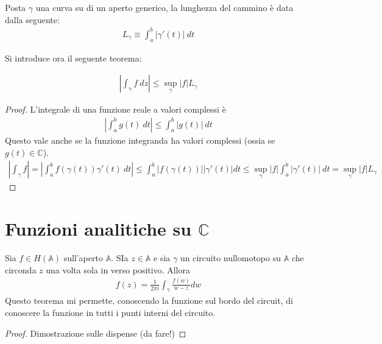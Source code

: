 \documentclass[a4paper, oneside]{article}
\begin{document}
\begin{definition}
    Posta $\gamma$ una curva su di un aperto generico, la lunghezza del cammino 
    è data dalla seguente:
    \begin{align}
        L_\gamma \equiv \int_{a}^{b} \left| \gamma'(t) \right| \ dt  
    \end{align}
\end{definition}
Si introduce ora il seguente teorema:
\begin{theorem}
    \begin{align}
        \left| \int_{\gamma} f \ dz  \right| \leq \sup_{\gamma} \left| f \right| L_\gamma   
    \end{align}
\end{theorem}
\begin{proof}
    L'integrale di una funzione reale a valori complessi è 
    \begin{gather*}
        \left| \int_{a}^{b} g(t) \ dt  \right| \leq \int_{a}^{b} \left| g(t) \right| \ dt    
    \end{gather*}
    Questo vale anche se la funzione integranda ha valori complessi (ossia se $g(t) \in \mathbb{C}$).
    \begin{gather*}
        \left| \int_{\gamma}^{} f \right| = \left| \int_{a}^{b} f(\gamma(t)) \gamma'(t)   \ dt \right| \leq  \int_{a}^{b} \left| f(\gamma(t)) \right| \left| \gamma'(t) \right|  dt \leq \sup_{\gamma}\left| f \right| \int_{a}^{b} \left| \gamma'(t) \right| \ dt = \sup_{\gamma}\left| f \right| L_\gamma    
    \end{gather*}
\end{proof}


\section{Funzioni analitiche su $\mathbb{C}$}
\begin{theorem}
    Sia $f \in H(\mathbb{A})$ sull'aperto $\mathbb{A}$. SIa $z \in \mathbb{A}$ e 
    sia $\gamma$ un circuito nullomotopo su $\mathbb{A}$ che circonda $z$ una volta
    sola in verso positivo. Allora
    \begin{align}
        f(z) = \frac{1}{2\pi i} \int_{\gamma} \frac{f(w)}{w - z} dw 
    \end{align}
    Questo teorema mi permette, conoscendo la funzione sul bordo del circuit, di conoscere la funzione in tutti i punti 
    interni del circuito.
\end{theorem}
\begin{proof}
    Dimostrazione sulle dispense (da fare!) 
\end{proof}
\end{document}
